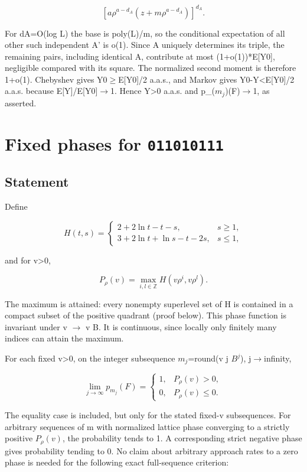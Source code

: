 \documentclass[11pt]{article}
\begin{document}
\[
\left[a\rho^{a-d_A}(z+m\rho^{a-d_A})\right]^{d_A}.
\]

For dA=O(log L) the base is poly(L)/m, so the conditional expectation of all other such independent A' is o(1). Since A uniquely determines its triple, the remaining pairs, including identical A, contribute at most (1+o(1))*E[Y0], negligible compared with its square. The normalized second moment is therefore 1+o(1). Chebyshev gives Y0\ensuremath{\geq}E[Y0]/2 a.a.s., and Markov gives Y0-Y<E[Y0]/2 a.a.s. because E[Y]/E[Y0]\ensuremath{\to}1. Hence Y>0 a.a.s. and p\_($m_{j}$)(F)\ensuremath{\to}1, as asserted.

\section{Fixed phases for \texttt{011010111}}

\subsection{Statement}

Define

\[
H(t,s)=\begin{cases}2+2\ln t-t-s,&s\geq1,\\3+2\ln t+\ln s-t-2s,&s\leq1,\end{cases}
\]

and for v>0,

\[
P_\rho(v)=\max_{i,l\in\mathbb Z}H(v\rho^i,v\rho^l).
\]

The maximum is attained: every nonempty superlevel set of H is contained in a compact subset of the positive quadrant (proof below). This phase function is invariant under v \ensuremath{\to} v B. It is continuous, since locally only finitely many indices can attain the maximum.

For each fixed v>0, on the integer subsequence $m_{j}$=round(v j $B^{j}$), j\ensuremath{\to}infinity,

\[
\lim_{j\to\infty}p_{m_j}(F)=\begin{cases}1,&P_\rho(v)>0,\\0,&P_\rho(v)\leq0.\end{cases}
\]

The equality case is included, but only for the stated fixed-v subsequences. For arbitrary sequences of m with normalized lattice phase converging to a strictly positive $P_\rho(v)$, the probability tends to 1. A corresponding strict negative phase gives probability tending to 0. No claim about arbitrary approach rates to a zero phase is needed for the following exact full-sequence criterion:
\end{document}
